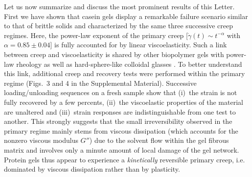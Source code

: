 \documentclass[twocolumn,superscriptaddress,showpacs,preprintnumbers,amsmath,amssymb,prl]{revtex4}
\newcommand\gp{\dot\gamma}
\begin{document}
Let us now summarize and discuss the most prominent results of this Letter. First we have shown that casein gels display a remarkable failure scenario similar to that of brittle solids and characterized by the same three successive creep regimes. Here, the power-law exponent of the primary creep [$\gp(t)\sim t^{-\alpha}$ with $\alpha=0.85\pm 0.04$] is fully accounted for by linear viscoelasticity. Such a link between creep and viscoelasticity is shared by other biopolymer gels with power-law rheology \cite{Gobeaux:2010,Jaishankar:2013} as well as hard-sphere-like colloidal glasses \cite{Siebenburger:2012}. To better understand this link, additional creep and recovery tests were performed within the primary regime (Figs.~3 and 4 in the Supplemental Material). Successive loading/unloading sequences on a fresh sample show that (i)~the strain is not fully recovered by a few percents, (ii)~the viscoelastic properties of the material are unaltered and (iii)~strain responses are indistinguishable from one test to another. This strongly suggests that the small irreversibility observed in the primary regime mainly stems from viscous dissipation (which accounts for the nonzero viscous modulus $G''$) due to the solvent flow within the gel fibrous matrix and involves only a minute amount of local damage of the gel network. Protein gels thus appear to experience a {\it kinetically} reversible primary creep, i.e. dominated by viscous dissipation rather than by plasticity.
\end{document}
